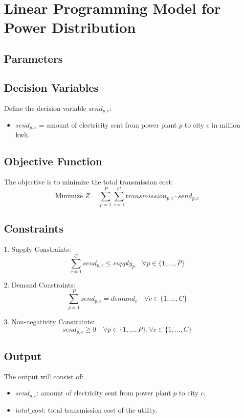 \documentclass{article}
\begin{document}
\section*{Linear Programming Model for Power Distribution}

\subsection*{Parameters}

\subsection*{Decision Variables}
Define the decision variable \( send_{p,c} \):
\begin{itemize}
    \item \( send_{p,c} \) = amount of electricity sent from power plant \( p \) to city \( c \) in million kwh.
\end{itemize}

\subsection*{Objective Function}
The objective is to minimize the total transmission cost:
\[
\text{Minimize } Z = \sum_{p=1}^{P} \sum_{c=1}^{C} transmission_{p,c} \cdot send_{p,c}
\]

\subsection*{Constraints}
1. Supply Constraints:
\[
\sum_{c=1}^{C} send_{p,c} \leq supply_{p} \quad \forall p \in \{1, \ldots, P\}
\]

2. Demand Constraints:
\[
\sum_{p=1}^{P} send_{p,c} = demand_{c} \quad \forall c \in \{1, \ldots, C\}
\]

3. Non-negativity Constraints:
\[
send_{p,c} \geq 0 \quad \forall p \in \{1, \ldots, P\}, \forall c \in \{1, \ldots, C\}
\]

\subsection*{Output}
The output will consist of:
\begin{itemize}
    \item \( send_{p,c} \): amount of electricity sent from power plant \( p \) to city \( c \).
    \item \( total\_cost \): total transmission cost of the utility.
\end{itemize}
\end{document}
